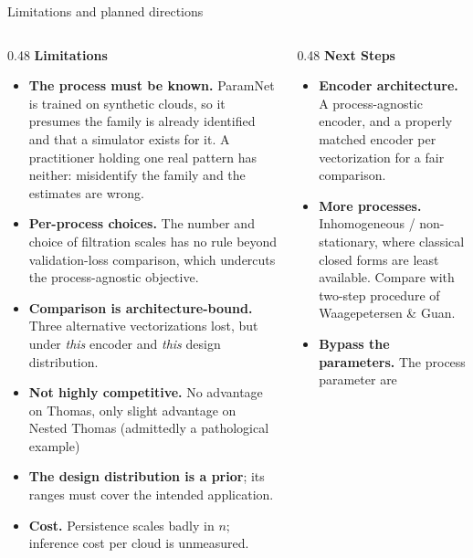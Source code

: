 \documentclass[aspectratio=169,10pt]{beamer}
\begin{document}
\begin{frame}{Limitations and planned directions}
\begin{columns}[T,onlytextwidth]
\begin{column}{0.48\textwidth}
\textbf{Limitations}\\[3pt]
{\footnotesize
\begin{itemize}\setlength\itemsep{1.5pt}
  \item \textbf{The process must be known.} ParamNet is trained on
        synthetic clouds, so it presumes the family is already identified
        and that a simulator exists for it.
        A practitioner holding one real pattern has neither: misidentify the
        family and the estimates are wrong.
  \item \textbf{Per-process choices.} The number and choice of filtration scales
        has no rule beyond validation-loss comparison, which undercuts the
        process-agnostic objective.
  \item \textbf{Comparison is architecture-bound.} Three alternative
        vectorizations lost, but under \emph{this} encoder and \emph{this}
        design distribution.
  \item \textbf{Not highly competitive.} No advantage on Thomas, only slight advantage on Nested Thomas (admittedly a pathological example)
  \item \textbf{The design distribution is a prior}; its ranges must cover the
        intended application.
  \item \textbf{Cost.} Persistence scales badly in $n$; inference cost per cloud
        is unmeasured.
\end{itemize}}
\end{column}
\begin{column}{0.48\textwidth}
\textbf{Next Steps}\\[3pt]
{\footnotesize
\begin{itemize}\setlength\itemsep{1.5pt}
  \item \textbf{Encoder architecture.} A process-agnostic encoder, and a
        properly matched encoder per vectorization for a fair comparison.
  \item \textbf{More processes.} Inhomogeneous / non-stationary, where classical
        closed forms are least available. Compare with two-step procedure of
        Waagepetersen \& Guan.
  \item \textbf{Bypass the parameters.} The process parameter are

\end{itemize}}
\end{column}
\end{columns}
\end{frame}
\end{document}
